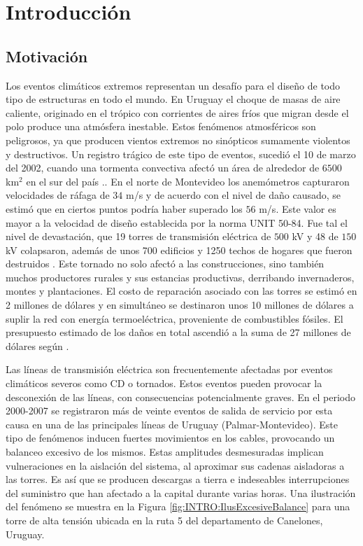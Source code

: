 \chapter{Introducción}\label{Cap:Introduccion}
 
\section{Motivación}
Los eventos climáticos extremos representan un desafío para el diseño de todo tipo de estructuras en todo el mundo. En Uruguay el choque de masas de aire caliente, originado en el trópico con corrientes de aires fríos que migran desde el polo produce una atmósfera inestable. Estos fenómenos atmosféricos son peligrosos, ya que producen vientos extremos no sinópticos sumamente violentos y destructivos. Un registro trágico de este tipo de eventos, sucedió el 10 de marzo del 2002, cuando una tormenta convectiva afectó un área de alrededor de $6500$ km$^2$ en el sur del país \cite{tormenta2002}.. En el norte de Montevideo los anemómetros capturaron velocidades de ráfaga de $34$ m/s y de acuerdo con el nivel de daño causado, se estimó que en ciertos puntos podría haber superado los $56$ m/s. Este valor es mayor a la velocidad de diseño establecida por la norma UNIT 50-84. Fue tal el nivel de devastación, que 19 torres de transmisión eléctrica de $500$ kV y 48 de $150$ kV colapsaron, además de unos 700 edificios y 1250 techos de hogares que fueron destruidos \citep{duranona2015significance}. Este tornado no solo afectó a las construcciones, sino también muchos productores rurales y sus estancias productivas, derribando invernaderos, montes y plantaciones. El costo de reparación asociado con las torres se estimó en 2 millones de dólares y en simultáneo se destinaron unos 10 millones de dólares a suplir la red con energía termoeléctrica, proveniente de combustibles fósiles. El presupuesto estimado de los daños en total ascendió a la suma de 27 millones de dólares según \cite{duranona2019first}. 

Las líneas de transmisión eléctrica son frecuentemente afectadas por eventos climáticos severos como \gls{CD} o tornados. Estos eventos pueden provocar la desconexión de las líneas, con consecuencias potencialmente graves. En el periodo 2000-2007 se registraron más de veinte eventos de salida de servicio por esta causa en una de las principales líneas de Uruguay (Palmar-Montevideo). Este tipo de fenómenos inducen fuertes movimientos en los cables, provocando un balanceo excesivo de los mismos. Estas amplitudes desmesuradas implican vulneraciones en la aislación del sistema, al aproximar sus cadenas aisladoras a las torres. Es así que se producen descargas a tierra e indeseables interrupciones del suministro que han afectado a la capital durante varias horas. Una ilustración del fenómeno se muestra en la Figura \ref{fig:INTRO:IlusExcesiveBalance} para una torre de alta tensión ubicada en la ruta 5 del departamento de Canelones, Uruguay. 

